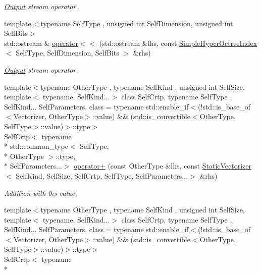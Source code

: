 \begin{DoxyCompactItemize}
\begin{DoxyCompactList}\small\item\em \hyperlink{exceptionOutput}{Output} stream operator. \end{DoxyCompactList}\item 
{\footnotesize template$<$typename Self\-Type , unsigned int Self\-Dimension, unsigned int Self\-Bits$>$ }\\std\-::ostream \& \hyperlink{namespacemagrathea_a13c4fa7b8129853d9400181732330c75}{operator$<$$<$} (std\-::ostream \&lhs, const \hyperlink{exceptionmagrathea_1_1SimpleHyperOctreeIndex}{Simple\-Hyper\-Octree\-Index}$<$ Self\-Type, Self\-Dimension, Self\-Bits $>$ \&rhs)
\begin{DoxyCompactList}\small\item\em \hyperlink{exceptionOutput}{Output} stream operator. \end{DoxyCompactList}\item 
{\footnotesize template$<$typename Other\-Type , typename Self\-Kind , unsigned int Self\-Size, template$<$ typename, Self\-Kind...$>$ class Self\-Crtp, typename Self\-Type , Self\-Kind... Self\-Parameters, class  = typename std\-::enable\-\_\-if$<$(!std\-::is\-\_\-base\-\_\-of$<$\-Vectorizer, Other\-Type$>$\-::value) \&\& (std\-::is\-\_\-convertible$<$\-Other\-Type, Self\-Type$>$\-::value)$>$\-::type$>$ }\\Self\-Crtp$<$ typename \\*
std\-::common\-\_\-type$<$ Self\-Type, \\*
Other\-Type $>$\-::type, \\*
Self\-Parameters...$>$ \hyperlink{namespacemagrathea_a953954bed141f42a1bcd833198395f41}{operator+} (const Other\-Type \&lhs, const \hyperlink{classmagrathea_1_1StaticVectorizer}{Static\-Vectorizer}$<$ Self\-Kind, Self\-Size, Self\-Crtp, Self\-Type, Self\-Parameters...$>$ \&rhs)
\begin{DoxyCompactList}\small\item\em Addition with lhs value. \end{DoxyCompactList}\item 
{\footnotesize template$<$typename Other\-Type , typename Self\-Kind , unsigned int Self\-Size, template$<$ typename, Self\-Kind...$>$ class Self\-Crtp, typename Self\-Type , Self\-Kind... Self\-Parameters, class  = typename std\-::enable\-\_\-if$<$(!std\-::is\-\_\-base\-\_\-of$<$\-Vectorizer, Other\-Type$>$\-::value) \&\& (std\-::is\-\_\-convertible$<$\-Other\-Type, Self\-Type$>$\-::value)$>$\-::type$>$ }\\Self\-Crtp$<$ typename \\*

\end{DoxyCompactItemize}

